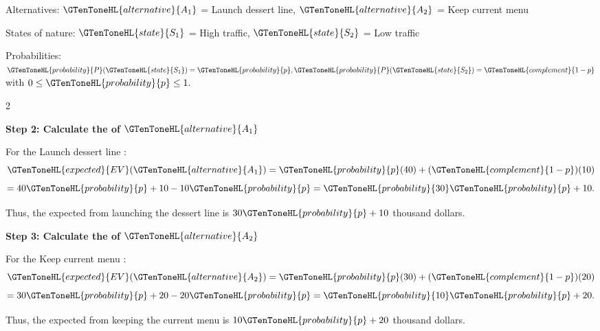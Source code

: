 	Alternatives:
	$\GTenToneHL{alternative}{A_1}$ = Launch dessert line,
	$\GTenToneHL{alternative}{A_2}$ = Keep current menu
	
	States of nature:
	$\GTenToneHL{state}{S_1}$ = High traffic,
	$\GTenToneHL{state}{S_2}$ = Low traffic
	
	Probabilities:
	$
	\GTenToneHL{probability}{P}(\GTenToneHL{state}{S_1})=\GTenToneHL{probability}{p},
	\GTenToneHL{probability}{P}(\GTenToneHL{state}{S_2})=\GTenToneHL{complement}{1-p}
	$
	with
	$
	0\leq \GTenToneHL{probability}{p}\leq1.
	$
	
	\vspace{-3mm}
	
	\noindent
	\setlength{\columnseprule}{0.4pt} 
	\begin{multicols}{2}
		\vspace{0pt}
		
		\textbf{Step 2: Calculate the   of $\GTenToneHL{alternative}{A_1}$}
		
		For the Launch dessert line :
		\[
		\GTenToneHL{expected}{EV}(\GTenToneHL{alternative}{A_1})
		=
		\GTenToneHL{probability}{p}(40)
		+
		(\GTenToneHL{complement}{1-p})(10)
		\]
		\[
		=
		40\GTenToneHL{probability}{p}+10-10\GTenToneHL{probability}{p}
		=
		\GTenToneHL{probability}{30}\GTenToneHL{probability}{p}+10.
		\]
		
		Thus, the expected  from launching the dessert line is
		$30\GTenToneHL{probability}{p}+10$ thousand dollars.
		
		\columnbreak
		
		\textbf{Step 3: Calculate the   of $\GTenToneHL{alternative}{A_2}$}
		
		For the Keep current menu :
		\[
		\GTenToneHL{expected}{EV}(\GTenToneHL{alternative}{A_2})
		=
		\GTenToneHL{probability}{p}(30)
		+
		(\GTenToneHL{complement}{1-p})(20)
		\]
		\[
		=
		30\GTenToneHL{probability}{p}+20-20\GTenToneHL{probability}{p}
		=
		\GTenToneHL{probability}{10}\GTenToneHL{probability}{p}+20.
		\]
		
		Thus, the expected  from keeping the current menu is
		$10\GTenToneHL{probability}{p}+20$ thousand dollars.
		
	\end{multicols}
	
	
